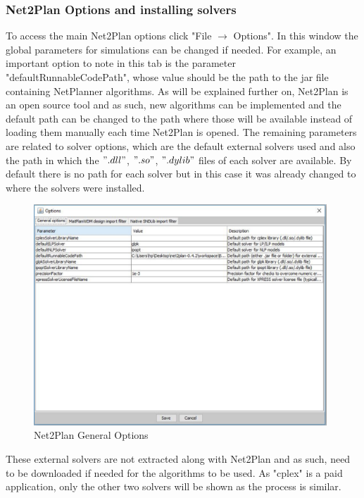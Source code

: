 	\subsubsection{Net2Plan Options and installing solvers}
	\vspace{0.5cm}
	To access the main Net2Plan options click "File $\rightarrow$ Options". In this window the global parameters for simulations can be changed if needed.
	For example, an important option to note in this tab is the parameter "defaultRunnableCodePath", whose value should be the path to the jar file containing NetPlanner algorithms. As will be explained further on, Net2Plan is an open source tool and as such, new algorithms can be implemented and the default path can be changed to the path where those will be available instead of loading them manually each time Net2Plan is opened.	The remaining parameters are related to solver options, which are the default external solvers used and also the path in which the $".dll"$, $".so"$, $".dylib"$ files of each solver are available. By default there is no path for each solver but in this case it was already changed to where the solvers were installed.
	\pagebreak
	
	\begin{figure}[h!]
		\centering
		\includegraphics[width = 11cm]{Net2Plan_options.pdf}
		\caption{Net2Plan General Options}
	\end{figure}
		
	
			
	These external solvers are not extracted along with Net2Plan and as such, need to be downloaded if needed for the algorithms to be used. As "cplex" is a paid application, only the other two solvers will be shown as the process is similar.\\
		

